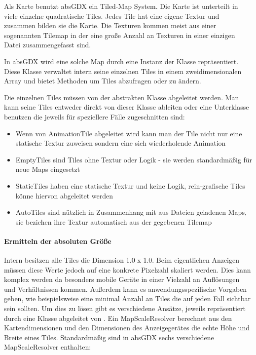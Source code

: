 Als Karte benutzt absGDX ein Tiled-Map System. Die Karte ist unterteilt in viele einzelne quadratische Tiles.
Jedes Tile hat eine eigene Textur und zusammen bilden sie die Karte. Die Texturen kommen meist aus einer sogenannten Tilemap in der eine große Anzahl an Texturen in einer einzigen Datei zusammengefasst sind.


In absGDX wird eine solche Map durch eine Instanz der Klasse  repräsentiert. Diese Klasse verwaltet intern seine einzelnen Tiles in einem zweidimensionalen Array und bietet Methoden um Tiles abzufragen oder zu ändern.

Die einzelnen Tiles müssen von der abstrakten Klasse  abgeleitet werden. Man kann seine Tiles entweder direkt von dieser Klasse ableiten oder eine Unterklasse benutzen die jeweils für speziellere Fälle zugeschnitten sind:

\begin{itemize}
  \item {} Wenn von AnimationTile abgeleitet wird kann man der Tile nicht nur eine statische Textur zuweisen sondern eine sich wiederholende Animation
  \item {} EmptyTiles sind Tiles ohne Textur oder Logik - sie werden standardmäßig für neue Maps eingesetzt
  \item {} StaticTiles haben eine statische Textur und	keine Logik, rein-grafische Tiles könne hiervon abgeleitet werden
  \item {} AutoTiles sind nützlich in Zusammenhang mit aus Dateien geladenen Maps, sie beziehen ihre Textur automatisch aus der gegebenen Tilemap
\end{itemize}

\paragraph{Ermitteln der absoluten Größe}

Intern besitzen alle Tiles die Dimension 1.0 x 1.0. Beim eigentlichen Anzeigen müssen diese Werte jedoch auf eine konkrete Pixelzahl skaliert werden. Dies kann komplex werden da besonders mobile Geräte in einer Vielzahl an Auflösungen und Verhältnissen kommen. Außerdem kann es anwendungsspezifische Vorgaben geben, wie beispielsweise eine minimal Anzahl an Tiles die auf jeden Fall sichtbar sein sollten.
Um dies zu lösen gibt es verschiedene Ansätze, jeweils repräsentiert durch eine Klasse abgeleitet von .
Ein MapScaleResolver berechnet aus den Kartendimensionen und den Dimensionen des Anzeigegerätes die echte Höhe und Breite eines Tiles.
Standardmäßig sind in absGDX sechs verschiedene MapScaleResolver enthalten:

